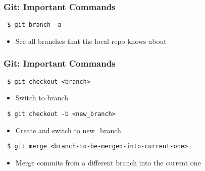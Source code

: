 \documentclass{beamer} %
\begin{document}
\begin{frame}[t, fragile]
\frametitle{Git: Important Commands}

\begin{verbatim} 
 $ git branch -a
\end{verbatim}

\begin{itemize}
	\item See all branches that the local repo knows about
\end{itemize}
\end{frame}


\begin{frame}[t, fragile]
\frametitle{Git: Important Commands}

\begin{verbatim} 
 $ git checkout <branch>
\end{verbatim}

\begin{itemize}
	\item Switch to branch 
\end{itemize}


\begin{verbatim} 
 $ git checkout -b <new_branch>
\end{verbatim}

\begin{itemize}
	\item Create and switch to new\_branch 
\end{itemize}

\begin{verbatim} 
 $ git merge <branch-to-be-merged-into-current-one>
\end{verbatim}

\begin{itemize}
	\item Merge commits from a different branch into the current one
\end{itemize}

\end{frame}
\end{document}
